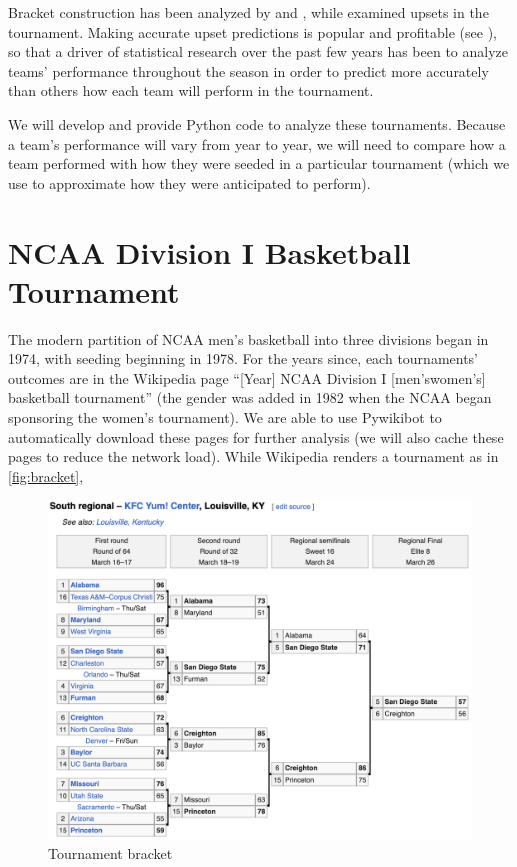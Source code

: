 \documentclass{article}
\begin{document}
Bracket construction has been analyzed by \cite{Schwenk} and \cite{Seltzer}, while \cite{Wittry} examined upsets in the tournament.  Making accurate upset predictions is popular and profitable (see \cite{Chartier}), so that a driver of statistical research over the past few years has been to analyze teams' performance throughout the season in order to predict more accurately than others how each team will perform in the tournament.

We will develop and provide Python code to analyze these tournaments.  Because a team's performance will vary from year to year, we will need to compare how a team performed with how they were seeded in a particular tournament (which we use to approximate how they were anticipated to perform).


\section{NCAA Division I Basketball Tournament}
The modern partition of NCAA men's basketball into three divisions began in 1974, with seeding beginning in 1978.  For the years since, each tournaments' outcomes are in the Wikipedia page ``[Year] NCAA Division I [men's\textbar women's] basketball tournament'' (the gender was added in 1982 when the NCAA began sponsoring the women's tournament).  We are able to use Pywikibot\cite{pywikibot} to automatically download these pages for further analysis (we will also cache these pages to reduce the network load).  While Wikipedia renders a tournament as in \autoref{fig:bracket},
\begin{figure}
\includegraphics[width=\linewidth]{2023bracket}
\caption{\label{fig:bracket}Tournament bracket}
\end{figure}
\end{document}
